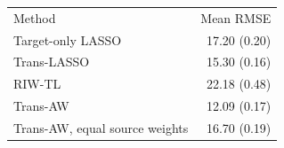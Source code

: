 \begin{tabular}{lr}
Method & Mean RMSE \\
Target-only LASSO & 17.20 (0.20) \\
Trans-LASSO & 15.30 (0.16) \\
RIW-TL & 22.18 (0.48) \\
Trans-AW & 12.09 (0.17) \\
Trans-AW, equal source weights & 16.70 (0.19) \\
\end{tabular}
